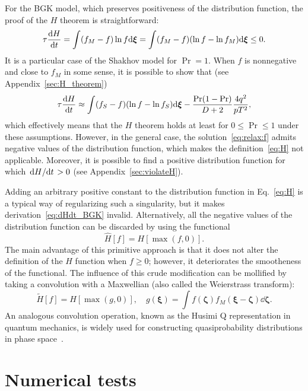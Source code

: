 \documentclass{article}
\newcommand{\bxi}{\boldsymbol{\xi}}
\newcommand{\bzeta}{\boldsymbol{\zeta}}
\begin{document}
For the BGK model, which preserves positiveness of the distribution function, the proof of the $H$ theorem is straightforward:
\begin{equation}\label{eq:dHdt_BGK}
    \tau\dv{H}{t} = \int(f_M-f)\ln{f}\dd\bxi = \int (f_M-f)(\ln{f}-\ln{f_M})\dd\bxi \leq 0.
\end{equation}
It is a particular case of the Shakhov model for $\Pr=1$. When $f$ is nonnegative and close to $f_M$ in some sense,
it is possible to show that (see Appendix~\ref{sec:H_theorem})
\begin{equation}\label{eq:dHdt_Shakhov}
    \tau\dv{H}{t} \approx \int(f_S-f)(\ln{f}-\ln{f_S})\dd\bxi - \frac{\Pr(1-\Pr)}{D+2}\frac{4q^2}{pT^2},
\end{equation}
which effectively means that the $H$ theorem holds at least for $0\leq\Pr\leq1$ under these assumptions.
However, in the general case, the solution~\eqref{eq:relax:f} admits negative values of the distribution function,
which makes the definition~\eqref{eq:H} not applicable.
Moreover, it is possible to find a positive distribution function for which $\dv*{H}{t}>0$ (see Appendix~\ref{sec:violateH}).

Adding an arbitrary positive constant to the distribution function in Eq.~\eqref{eq:H} is a typical way
of regularizing such a singularity, but it makes derivation~\eqref{eq:dHdt_BGK} invalid.
Alternatively, all the negative values of the distribution function can be discarded by using the functional
\begin{equation}\label{eq:H_discarded}
    \hat{H}[f] = H[\max(f,0)].
\end{equation}
The main advantage of this primitive approach is that it does not alter the definition of the $H$ function
when $f\geq0$; however, it deteriorates the smootheness of the functional.
The influence of this crude modification can be mollified by taking a convolution with a Maxwellian
(also called the Weierstrass transform):
\begin{equation}\label{eq:H_blurred}
    \tilde{H}[f] = H[\max(g,0)], \quad g(\bxi) = \int f(\bzeta)f_M(\bxi-\bzeta)\dd\bzeta.
\end{equation}
An analogous convolution operation, known as the Husimi Q representation in quantum mechanics,
is widely used for constructing quasiprobability distributions in phase space~\cite{husimi1940some}.

\section{Numerical tests}
\end{document}

